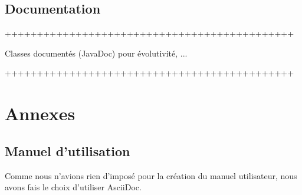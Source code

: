 \documentclass{polytech/polytech}
\begin{document}
	\section{Documentation}
	+++++++++++++++++++++++++++++++++++++++++++++

	Classes documentés (JavaDoc) pour évolutivité, ...

	+++++++++++++++++++++++++++++++++++++++++++++
	\chapter{Annexes}

	\section{Manuel d'utilisation}
	Comme nous n'avions rien d'imposé pour la création du manuel utilisateur, nous avons fais le choix d'utiliser AsciiDoc.

	
\end{document}
